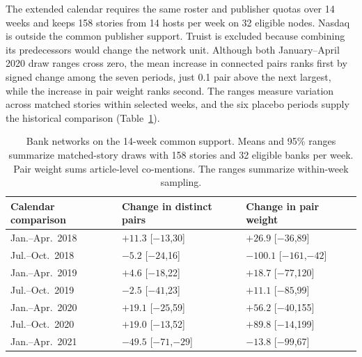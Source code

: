 The extended calendar requires the same roster and publisher quotas over
14 weeks and keeps 158 stories from 14 hosts per week on 32 eligible
nodes. Nasdaq is outside the common publisher support. Truist is
excluded because combining its predecessors would change the network
unit. Although both January--April 2020 draw ranges cross zero, the mean
increase in connected pairs ranks first by signed change among the
seven periods, just 0.1 pair above the next largest, while the increase
in pair weight ranks second. The ranges measure variation across matched
stories within selected weeks, and the six placebo periods supply the
historical comparison (Table~\ref{tab:app-banks}).

\begin{table}[t]
  \centering
  \small
  \caption{Bank networks on the 14-week common support. Means and 95\%
    ranges summarize matched-story draws with 158 stories and 32 eligible
    banks per week. Pair weight sums article-level co-mentions. The
  ranges summarize within-week sampling.}
  \label{tab:app-banks}
  \begin{tabular}{lll}
    \toprule
    Calendar comparison & Change in distinct pairs & Change in pair weight \\
    \midrule
    Jan.--Apr.\ 2018 & $+11.3$ [$-13$,30] & $+26.9$ [$-36$,89] \\
    Jul.--Oct.\ 2018 & $-5.2$ [$-24$,16] & $-100.1$ [$-161$,$-42$] \\
    Jan.--Apr.\ 2019 & $+4.6$ [$-18$,22] & $+18.7$ [$-77$,120] \\
    Jul.--Oct.\ 2019 & $-2.5$ [$-41$,23] & $+11.1$ [$-85$,99] \\
    Jan.--Apr.\ 2020 & $+19.1$ [$-25$,59] & $+56.2$ [$-40$,155] \\
    Jul.--Oct.\ 2020 & $+19.0$ [$-13$,52] & $+89.8$ [$-14$,199] \\
    Jan.--Apr.\ 2021 & $-49.5$ [$-71$,$-29$] & $-13.8$ [$-99$,67] \\
    \bottomrule
  \end{tabular}
\end{table}

